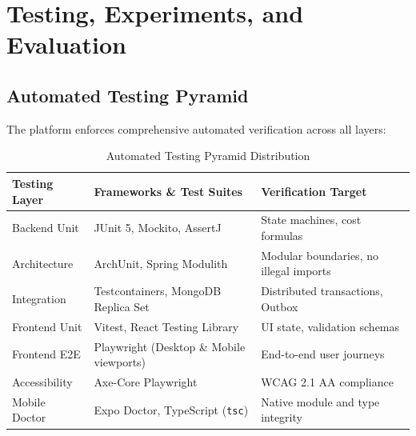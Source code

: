 \documentclass[conference,10pt,a4paper]{IEEEtran}
\begin{document}
\section{Testing, Experiments, and Evaluation}

\subsection{Automated Testing Pyramid}
The platform enforces comprehensive automated verification across all layers:
\begin{table}[!ht]
\caption{Automated Testing Pyramid Distribution}
\label{tab:testing_pyramid}
\centering
\scriptsize
\begin{tabularx}{\columnwidth}{lXl}
\toprule
\textbf{Testing Layer} & \textbf{Frameworks \& Test Suites} & \textbf{Verification Target} \\
\midrule
Backend Unit & JUnit 5, Mockito, AssertJ & State machines, cost formulas \\
Architecture & ArchUnit, Spring Modulith & Modular boundaries, no illegal imports \\
Integration & Testcontainers, MongoDB Replica Set & Distributed transactions, Outbox \\
Frontend Unit & Vitest, React Testing Library & UI state, validation schemas \\
Frontend E2E & Playwright (Desktop \& Mobile viewports) & End-to-end user journeys \\
Accessibility & Axe-Core Playwright & WCAG 2.1 AA compliance \\
Mobile Doctor & Expo Doctor, TypeScript (\texttt{tsc}) & Native module and type integrity \\
\bottomrule
\end{tabularx}
\end{table}
\end{document}
